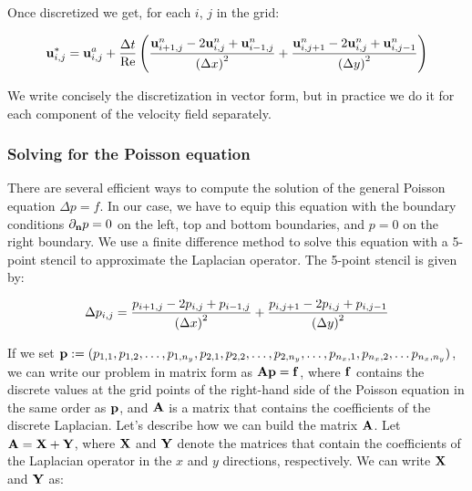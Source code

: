 Once discretized we get, for each $i$, $j$ in the grid:

\begin{equation*}
  \boldsymbol{\mathrm{u}}^*_{i,j} = \boldsymbol{\mathrm{u}}^a_{i,j} + \frac{\Delta t}{\mathrm{Re}}\left( \frac{\boldsymbol{\mathrm{u}}^n_{i+1,j} - 2\boldsymbol{\mathrm{u}}^n_{i,j} + \boldsymbol{\mathrm{u}}^n_{i-1,j}}{{(\Delta x)}^2} + \frac{\boldsymbol{\mathrm{u}}^n_{i,j+1} - 2\boldsymbol{\mathrm{u}}^n_{i,j} + \boldsymbol{\mathrm{u}}^n_{i,j-1}}{{(\Delta y)}^2}\right)
\end{equation*}

We write concisely the discretization in vector form, but in practice we do it for each component of the velocity field separately.

\subsubsection*{Solving for the Poisson equation}\label{sec: solvingPoisson}
There are several efficient ways to compute the solution of the general Poisson equation $\Delta p = f$. In our case, we have to equip this equation with the boundary conditions $\partial_{\boldsymbol{\mathrm{n}}}p=0$ on the left, top and bottom boundaries, and $p=0$ on the right boundary. We use a finite difference method to solve this equation with a 5-point stencil to approximate the Laplacian operator. The 5-point stencil is given by:

\begin{equation*}
  \Delta p_{i,j} = \frac{p_{i+1,j} - 2 p_{i,j} + p_{i-1,j}}{{(\Delta x)}^2} + \frac{p_{i,j+1} - 2 p_{i,j} + p_{i,j-1}}{{(\Delta y)}^2}
\end{equation*}

If we set $\boldsymbol{\mathrm{p}}:=(p_{1,1}, p_{1,2}, \ldots, p_{1,n_y}, p_{2,1}, p_{2,2}, \ldots, p_{2,n_y},\ldots, p_{n_x,1},p_{n_x,2},\ldots p_{n_x,n_y})$, we can write our problem in matrix form as $\boldsymbol{\mathrm{A}}\boldsymbol{\mathrm{p}}=\boldsymbol{\mathrm{f}}$, where $\boldsymbol{\mathrm{f}}$ contains the discrete values at the grid points of the right-hand side of the Poisson equation in the same order as $\boldsymbol{\mathrm{p}}$, and $\boldsymbol{\mathrm{A}}$ is a matrix that contains the coefficients of the discrete Laplacian. Let's describe how we can build the matrix $\boldsymbol{\mathrm{A}}$. Let $\boldsymbol{\mathrm{A}}=\boldsymbol{\mathrm{X}} + \boldsymbol{\mathrm{Y}}$, where $\boldsymbol{\mathrm{X}}$ and $\boldsymbol{\mathrm{Y}}$ denote the matrices that contain the coefficients of the Laplacian operator in the $x$ and $y$ directions, respectively. We can write $\boldsymbol{\mathrm{X}}$ and $\boldsymbol{\mathrm{Y}}$ as:

